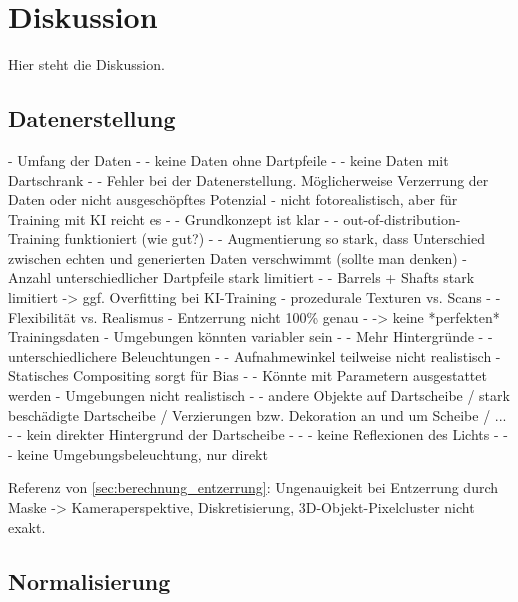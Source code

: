 
\chapter{Diskussion}
\label{cha:diskussion}

Hier steht die Diskussion.

\section{Datenerstellung}
\label{sec:diskussion:daten}

- Umfang der Daten
- - keine Daten ohne Dartpfeile
- - keine Daten mit Dartschrank
- - Fehler bei der Datenerstellung. Möglicherweise Verzerrung der Daten oder nicht ausgeschöpftes Potenzial
- nicht fotorealistisch, aber für Training mit KI reicht es
- - Grundkonzept ist klar
- - out-of-distribution-Training funktioniert (wie gut?)
- - Augmentierung so stark, dass Unterschied zwischen echten und generierten Daten verschwimmt (sollte man denken)
- Anzahl unterschiedlicher Dartpfeile stark limitiert
- - Barrels + Shafts stark limitiert -> ggf. Overfitting bei KI-Training
- prozedurale Texturen vs. Scans
- - Flexibilität vs. Realismus
- Entzerrung nicht 100\% genau
- -> keine *perfekten* Trainingsdaten
- Umgebungen könnten variabler sein
- - Mehr Hintergründe
- - unterschiedlichere Beleuchtungen
- - Aufnahmewinkel teilweise nicht realistisch
- Statisches Compositing sorgt für Bias
- - Könnte mit Parametern ausgestattet werden
- Umgebungen nicht realistisch
- - andere Objekte auf Dartscheibe / stark beschädigte Dartscheibe / Verzierungen bzw. Dekoration an und um Scheibe / ...
- - kein direkter Hintergrund der Dartscheibe
- - - keine Reflexionen des Lichts
- - - keine Umgebungsbeleuchtung, nur direkt

Referenz von \autoref{sec:berechnung_entzerrung}: Ungenauigkeit bei Entzerrung durch Maske -> Kameraperspektive, Diskretisierung, 3D-Objekt-Pixelcluster nicht exakt.


\section{Normalisierung}
\label{sec:diskussion:cv}


